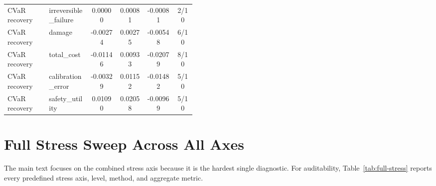 \documentclass{article}
\begin{document}
\begin{center}
\begin{longtable}{p{0.22\linewidth}p{0.22\linewidth}cccc}
CVaR recovery & irreversible\_failure & 0.00000 & 0.00081 & -0.00081 & 2/10\\
CVaR recovery & damage & -0.00274 & 0.00275 & -0.00548 & 6/10\\
CVaR recovery & total\_cost & -0.01146 & 0.00933 & -0.02079 & 8/10\\
CVaR recovery & calibration\_error & -0.00329 & 0.01152 & -0.01482 & 5/10\\
CVaR recovery & safety\_utility & 0.01090 & 0.02058 & -0.00969 & 5/10\\
\bottomrule
\end{longtable}
\normalsize
\end{center}

\section{Full Stress Sweep Across All Axes}

The main text focuses on the combined stress axis because it is the hardest single diagnostic. For auditability, Table~\ref{tab:full-stress} reports every predefined stress axis, level, method, and aggregate metric.
\end{document}
